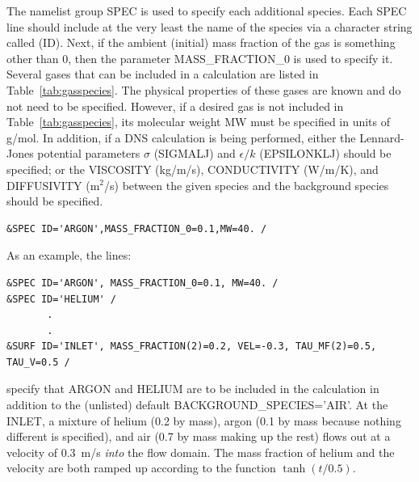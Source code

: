 \documentclass[11pt]{book}
\begin{document}
The namelist group {\ct SPEC} is used to specify each additional
species. Each {\ct SPEC} line should include at the very least
the name of the species via a character string called ({\ct ID}).
Next, if the ambient (initial) mass fraction of the gas is something
other than 0, then the parameter {\ct MASS\_FRACTION\_0} is used to
specify it.
Several gases that can be included in a calculation are listed in
Table~\ref{tab:gasspecies}. The physical properties
of these gases are known and do not need to be specified. However, if a
desired gas is not included in Table~\ref{tab:gasspecies}, its
molecular weight {\ct MW} must be specified in units of g/mol.
In addition, if a DNS calculation is being performed, either
the Lennard-Jones potential parameters $\sigma$ ({\ct SIGMALJ}) and
$\epsilon/k$ ({\ct EPSILONKLJ}) should be specified; or
the {\ct VISCOSITY} (kg/m/s), {\ct CONDUCTIVITY} (W/m/K), and
{\ct DIFFUSIVITY} (m$^2$/s) between the given species
and the background species should be specified.

\footnotesize
\begin{verbatim}
&SPEC ID='ARGON',MASS_FRACTION_0=0.1,MW=40. /
\end{verbatim}
\normalsize



As an example, the lines:

\footnotesize
\begin{verbatim}
&SPEC ID='ARGON', MASS_FRACTION_0=0.1, MW=40. /
&SPEC ID='HELIUM' /
       .
       .
&SURF ID='INLET', MASS_FRACTION(2)=0.2, VEL=-0.3, TAU_MF(2)=0.5, TAU_V=0.5 /
\end{verbatim}
\normalsize
specify that {\ct ARGON} and {\ct HELIUM} are to be included in the calculation
in addition to the (unlisted) default
{\ct BACKGROUND\_SPECIES='AIR'}. At
the {\ct INLET}, a mixture of helium (0.2 by mass), argon (0.1 by mass
because nothing different is specified), and air (0.7 by mass making
up the rest) flows out at a velocity of 0.3~m/s {\em into} the flow
domain. The mass fraction of helium and the velocity are both
ramped up according to the function $\tanh(t/0.5)$.
\end{document}
